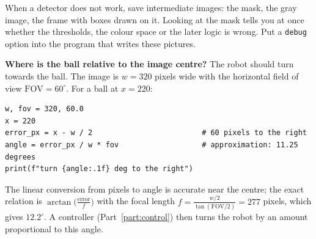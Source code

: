 \begin{keyidea}
When a detector does not work, save intermediate images: the mask, the gray image, the frame with boxes drawn on it. Looking at the mask tells you at once whether the thresholds, the colour space or the later logic is wrong. Put a \texttt{debug} option into the program that writes these pictures.
\end{keyidea}

\begin{example}
\textbf{Where is the ball relative to the image centre?} The robot should turn towards the ball. The image is $w=320$ pixels wide with the horizontal field of view $\text{FOV}=60^\circ$. For a ball at $x=220$:
\begin{verbatim}
w, fov = 320, 60.0
x = 220
error_px = x - w / 2                         # 60 pixels to the right
angle = error_px / w * fov                   # approximation: 11.25 degrees
print(f"turn {angle:.1f} deg to the right")
\end{verbatim}
The linear conversion from pixels to angle is accurate near the centre; the exact relation is $\arctan\!\big(\tfrac{\text{error}}{f}\big)$ with the focal length $f=\tfrac{w/2}{\tan(\text{FOV}/2)}=277$ pixels, which gives $12.2^\circ$. A controller (Part~\ref{part:control}) then turns the robot by an amount proportional to this angle.
\end{example}

